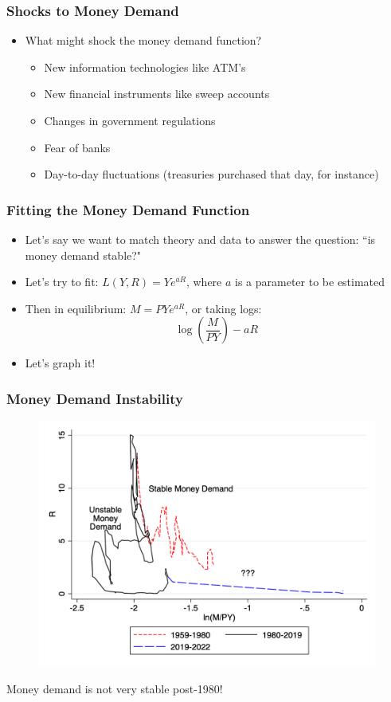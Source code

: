 \documentclass{beamer}
\begin{document}
\begin{frame}
\frametitle[alignment=center]{Shocks to Money Demand}
\begin{itemize}
\item What might shock the money demand function?
\begin{itemize}
\item New information technologies like ATM's
\item New financial instruments like sweep accounts
\item Changes in government regulations
\item Fear of banks
\item Day-to-day fluctuations (treasuries purchased that day, for instance)
\end{itemize}
\end{itemize}
\end{frame}


\begin{frame}
\frametitle[alignment=center]{Fitting the Money Demand Function}
\begin{itemize}
\item Let's say we want to match theory and data to answer the question: ``is money demand stable?"
\bigskip
\item Let's try to fit: $L(Y,R)=Ye^{aR}$, where $a$ is a parameter to be estimated
\bigskip
\item Then in equilibrium: $M=PYe^{aR}$, or taking logs:
$$\log\left(\frac{M}{PY}\right)-aR$$
\item Let's graph it!
\end{itemize}
\end{frame}

\begin{frame}
\frametitle[alignment=center]{Money Demand Instability}
\begin{figure}
\centering
\includegraphics[scale=0.24]{Figures/Fig_12pt14.png}
\end{figure}
Money demand is not very stable post-1980!
\end{frame}
\end{document}
